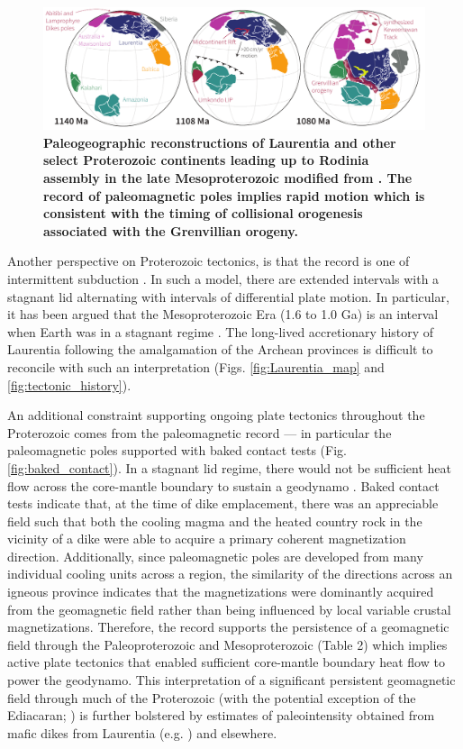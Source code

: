 \documentclass[11pt,letterpaper]{article}
\begin{document}
\begin{figure}
\centering
\includegraphics[width=\textwidth]{../Figures/Grenville_Reconstruction.pdf}
\caption{\small{\textbf{Paleogeographic reconstructions of Laurentia and other select Proterozoic continents leading up to Rodinia assembly in the late Mesoproterozoic modified from \cite{Swanson-Hysell2019a}. The record of paleomagnetic poles implies rapid motion which is consistent with the timing of collisional orogenesis associated with the Grenvillian orogeny.}}}
\label{fig:Grenville_reconstructions}
\end{figure}

Another perspective on Proterozoic tectonics, is that the record is one of intermittent subduction \citep{Silver2008a, ONeill2013a}. In such a model, there are extended intervals with a stagnant lid alternating with intervals of differential plate motion. In particular, it has been argued that the Mesoproterozoic Era (1.6 to 1.0 Ga) is an interval when Earth was in a stagnant regime \citep{Silver2008a, ONeill2013a}. The long-lived accretionary history of Laurentia following the amalgamation of the Archean provinces is difficult to reconcile with such an interpretation (Figs. \ref{fig:Laurentia_map} and \ref{fig:tectonic_history}).

An additional constraint supporting ongoing plate tectonics throughout the Proterozoic comes from the paleomagnetic record --- in particular the paleomagnetic poles supported with baked contact tests (Fig. \ref{fig:baked_contact}). In a stagnant lid regime, there would not be sufficient heat flow across the core-mantle boundary to sustain a geodynamo \citep{Nimmo2000a, Buffett2000b}. Baked contact tests indicate that, at the time of dike emplacement, there was an appreciable field such that both the cooling magma and the heated country rock in the vicinity of a dike were able to acquire a primary coherent magnetization direction. Additionally, since paleomagnetic poles are developed from many individual cooling units across a region, the similarity of the directions across an igneous province indicates that the magnetizations were dominantly acquired from the geomagnetic field rather than being influenced by local variable crustal magnetizations.  Therefore, the record supports the persistence of a geomagnetic field through the Paleoproterozoic and Mesoproterozoic (Table 2) which implies active plate tectonics that enabled sufficient core-mantle boundary heat flow to power the geodynamo.  This interpretation of a significant persistent geomagnetic field through much of the Proterozoic (with the potential exception of the Ediacaran; \citealp{Bono2019a}) is further bolstered by estimates of paleointensity obtained from mafic dikes from Laurentia (e.g. \citealp{Macouin2006a}) and elsewhere.
\end{document}
